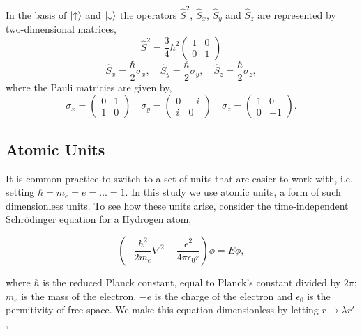     In the basis of $\ket{\uparrow}$ and $\ket{\downarrow}$ the operators $\hat{S}^2$, 
    $\hat{S}_x$, $\hat{S}_y$ and $\hat{S}_z$ are represented by two-dimensional matrices,
    \begin{equation}
        \hat{S}^2 = \frac{3}{4}\hbar^2\begin{pmatrix}
            1 & 0 \\ 0 & 1 
        \end{pmatrix}
    \end{equation}
    \begin{equation}
        \hat{S}_x = \frac{\hbar}{2}\sigma_x, \quad 
        \hat{S}_y = \frac{\hbar}{2}\sigma_y, \quad 
        \hat{S}_z = \frac{\hbar}{2}\sigma_z,
    \end{equation}
    where the Pauli matricies are given by, 
    \begin{equation}
        \sigma_x = \begin{pmatrix} 0 &  1 \\ 1 & 0 \end{pmatrix} \quad 
        \sigma_y = \begin{pmatrix} 0 & -i \\ i & 0 \end{pmatrix} \quad 
        \sigma_z = \begin{pmatrix} 1 &  0 \\ 0 & -1 \end{pmatrix}.
    \end{equation}

    \subsection{Atomic Units}

        It is common practice to switch to a set of units that are easier to work with,
        i.e. setting $\hbar = m_e = e = \dots = 1$. In this study we use atomic units, a
        form of such dimensionless units. To see how these units arise, consider
        the time-independent Schrödinger equation for a Hydrogen atom,

        \begin{equation}
            \left(-\frac{\hbar^2}{2m_e}\nabla^2 - \frac{e^2}{4\pi\epsilon_0 r} \right)
            \phi = E\phi,
        \end{equation}

        where $\hbar$ is the reduced Planck constant, equal to Planck's constant divided by 
        $2\pi$; $m_e$ is the mass of the electron, $-e$ is the charge of the electron and 
        $\epsilon_0$ is the permitivity of free space. We make this equation dimensionless by 
        letting $r \to \lambda r'$,

